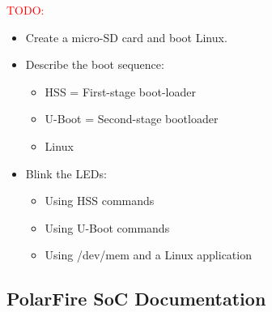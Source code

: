 \noindent\textcolor{red}{TODO:}
\begin{itemize}
\item Create a micro-SD card and boot Linux.
\item Describe the boot sequence:
\begin{itemize}
\item HSS = First-stage boot-loader
\item U-Boot = Second-stage bootloader
\item Linux
\end{itemize}
\item Blink the LEDs:
\begin{itemize}
\item Using HSS commands
\item Using U-Boot commands
\item Using /dev/mem and a Linux application
\end{itemize}
\end{itemize}

\subsection{PolarFire SoC Documentation}


